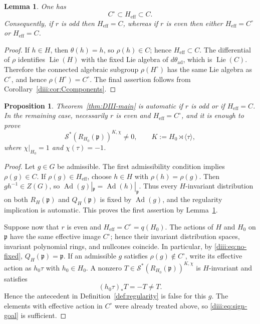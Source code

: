 \documentclass[10pt,a4paper]{amsart}
\numberwithin{equation}{section}
\newtheorem{proposition}[theorem]{Proposition}
\newtheorem{lemma}[theorem]{Lemma}
\newcommand{\Ad}{\operatorname{Ad}}
\newcommand{\fp}{\mathfrak p}
\newcommand{\cS}{\mathcal S}
\begin{document}
\begin{lemma}\label{diii:lem:Heff}
One has
\[
  C^\circ\subset H_{\mathrm{eff}}\subset C.
\]
Consequently, if $r$ is odd then $H_{\mathrm{eff}}=C$, whereas if $r$ is even then either $H_{\mathrm{eff}}=C^\circ$ or $H_{\mathrm{eff}}=C$.
\end{lemma}

\begin{proof}
If $h\in H$, then $\theta(h)=h$, so $\rho(h)\in C$; hence
$H_{\mathrm{eff}}\subset C$.  The differential of $\rho$ identifies
$\operatorname{Lie}(H)$ with the fixed Lie algebra of $d\theta_{\mathrm{ad}}$, which is
$\operatorname{Lie}(C)$.  Therefore the connected algebraic subgroup
$\rho(H^\circ)$ has the same Lie algebra as $C^\circ$, and hence
$\rho(H^\circ)=C^\circ$.  The final assertion follows from
Corollary~\ref{diii:cor:Ccomponents}.
\end{proof}

\begin{proposition}\label{diii:prop:effective-reduction}
Theorem~\ref{thm:DIII-main} is automatic if $r$ is odd or if
$H_{\mathrm{eff}}=C$.  In the remaining case, necessarily $r$ is even and
$H_{\mathrm{eff}}=C^\circ$, and it is enough to prove
\begin{equation}\label{diii:eq:sign-goal}
  \cS^*(R_{H_0}(\fp))^{K,\chi}\ne0,
  \qquad
  K:=H_0\rtimes\langle\tau\rangle,
\end{equation}
where $\chi|_{H_0}=1$ and $\chi(\tau)=-1$.
\end{proposition}

\begin{proof}
Let $g\in G$ be admissible.  The first admissibility condition implies
$\rho(g)\in C$.  If $\rho(g)\in H_{\mathrm{eff}}$, choose $h\in H$ with
$\rho(h)=\rho(g)$.  Then $gh^{-1}\in Z(G)$, so
$\Ad(g)|_{\fp}=\Ad(h)|_{\fp}$.  Thus every $H$-invariant distribution on both
$R_H(\fp)$ and $Q_H(\fp)$ is fixed by $\Ad(g)$, and the regularity implication is automatic.  This proves the first assertion by Lemma~\ref{diii:lem:Heff}.

Suppose now that $r$ is even and $H_{\mathrm{eff}}=C^\circ=q(H_0)$.  The actions of $H$ and $H_0$ on $\fp$ have the same effective image $C^\circ$; hence their invariant distribution spaces, invariant polynomial rings, and nullcones coincide.  In particular, by \eqref{diii:eq:no-fixed}, $Q_H(\fp)=\fp$.  If an admissible $g$ satisfies $\rho(g)\notin C^\circ$, write its effective action as $h_0\tau$ with $h_0\in H_0$.  A nonzero
$T\in\cS^*(R_{H_0}(\fp))^{K,\chi}$ is $H$-invariant and satisfies
\[
  (h_0\tau)_*T=-T\ne T.
\]
Hence the antecedent in Definition~\ref{def:regularity} is false for this $g$.  The elements with effective action in $C^\circ$ were already treated above, so \eqref{diii:eq:sign-goal} is sufficient.
\end{proof}
\end{document}

